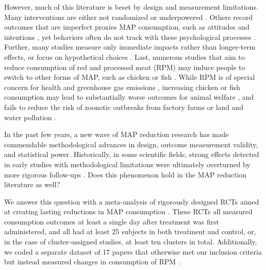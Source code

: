 \documentclass[sn-nature,referee,pdflatex]{sn-jnl}
\begin{document}
However, much of this literature is beset by design and measurement
limitations. Many interventions are either not randomized
\citep{garnett2020} or underpowered \citep{delichatsios2001}. Others
record outcomes that are imperfect proxies MAP consumption, such as
attitudes and intentions \citep{mathur2021effectiveness}, yet behaviors
often do not track with these psychological processes \citep{porat2024}.
Further, many studies measure only immediate impacts
\citep{hansen2021, griesoph2021} rather than longer-term effects, or
focus on hypothetical choices \citep{raghoebar2020, vermeer2010}. Last,
numerous studies that aim to reduce consumption of red and processed
meat (RPM) may induce people to switch to other forms of MAP, such as
chicken or fish \citep{grummon2023}. While RPM is of special concern for
health and greenhouse gas emissions \citep{abete2014, auclair2024},
increasing chicken or fish consumption may lead to substantially worse
outcomes for animal welfare \citep{mathur2022ethical}, and fails to
reduce the risk of zoonotic outbreaks from factory farms
\citep{hafez2020} or land and water pollution \citep{grvzinic2023}.

In the past few years, a new wave of MAP reduction research has made
commendable methodological advances in design, outcome measurement
validity, and statistical power. Historically, in some scientific
fields, strong effects detected in early studies with methodological
limitations were ultimately overturned by more rigorous follow-ups
\citep{wykes2008, paluck2019, scheel2021}. Does this phenomenon hold in
the MAP reduction literature as well?

We answer this question with a meta-analysis of rigorously designed RCTs
aimed at creating lasting reductions in MAP consumption
\citep{andersson2021, kanchanachitra2020, abrahamse2007, acharya2004, banerjee2019, bianchi2022, bochmann2017, bschaden2020, carfora2023, cooney2014, cooney2016, feltz2022, haile2021, hatami2018, hennessy2016, jalil2023, mathur2021effectiveness, merrill2009, norris2014, peacock2017, polanco2022, sparkman2021, weingarten2022, piester2020, aldoh2023, allen2002, camp2019, coker2022, sparkman2020, berndsen2005, bertolaso2015, fehrenbach2015, mattson2020, shreedhar2021}.
These RCTs all measured consumption outcomes at least a single day after
treatment was first administered, and all had at least 25 subjects in
both treatment and control, or, in the case of cluster-assigned studies,
at least ten clusters in total. Additionally, we coded a separate
dataset of 17 papers that otherwise met our inclusion criteria but
instead measured changes in consumption of RPM
\citep{anderson2017, carfora2017correlational, carfora2017randomised, carfora2019, carfora2019informational, delichatsios2001talking, dijkstra2022, emmons2005cancer, emmons2005project, jaacks2014, james2015, lee2018, lindstrom2015, perino2022, schatzkin2000, sorensen2005, wolstenholme2020}.
\end{document}

